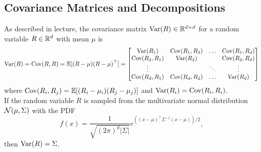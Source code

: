 \subsection{Covariance Matrices and Decompositions}
As described in lecture, the covariance matrix $\text{Var}(R) \in \mathbb{R}^{d\times d}$ for a random variable $R \in \mathbb{R}^d$ with mean $\mu$ is
$$
\text{Var}(R) = \text{Cov}(R, R) = {\mathbb E}[(R- \mu)(R-\mu)^{\top}] =
\begin{bmatrix}
\text{Var}(R_1) & \text{Cov}(R_1, R_2) & \ldots & \text{Cov}(R_1, R_d) \\
\text{Cov}(R_2, R_1) & \text{Var}(R_2) & & \text{Cov}(R_2, R_d) \\
\vdots & & \ddots & \vdots \\
\text{Cov}(R_d, R_1) & \text{Cov}(R_d, R_2) & \ldots & \text{Var}(R_d)
\end{bmatrix}
$$
where $\text{Cov}(R_i, R_j) = {\mathbb E}[(R_i - \mu_i)(R_j - \mu_j)]$ and $\text{Var}(R_i) = \text{Cov}(R_i, R_i)$. \\

\noindent
If the random variable $R$ is sampled from the multivariate normal distribution $\mathcal{N}(\mu, \Sigma)$ with the PDF
$$ f(x) = \frac{1}{\sqrt{(2\pi)^d |\Sigma|}} e^{((x-\mu)^{\top}\Sigma^{-1}(x-\mu))/2},$$
then $\text{Var}(R) = \Sigma$.\\

